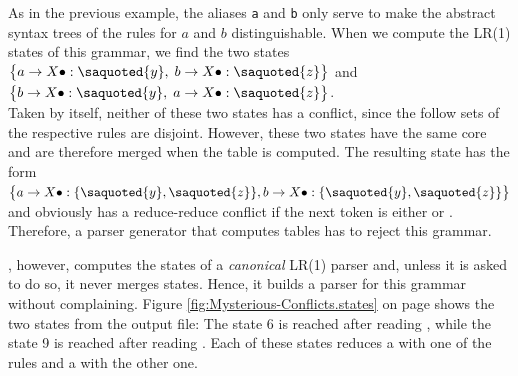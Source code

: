 \noindent
As in the previous example, the aliases \texttt{a} and \texttt{b} only serve to make the abstract syntax trees of
the rules for $a$ and $b$ distinguishable.  When we compute the LR(1) states of this grammar, we find the two states
\\[0.2cm]
\hspace*{1.3cm}
$\bigl\{ a \rightarrow X \bullet: \saquoted{y},\;
         b \rightarrow X \bullet: \saquoted{z}
\bigr\}$
\quad and \quad
$\bigl\{ b \rightarrow X \bullet: \saquoted{y},\;
         a \rightarrow X \bullet: \saquoted{z}
\bigr\}$.
\\[0.2cm]
Taken by itself, neither of these two states has a conflict, since the follow sets of the respective rules are
disjoint.  However, these two states have the same core and are therefore merged when the
 table is computed.  The resulting state has the form
\\[0.2cm]
\hspace*{1.3cm}
$\bigl\{ a \rightarrow X \bullet:\{\saquoted{y}, \saquoted{z} \},
         b \rightarrow X \bullet:\{\saquoted{y}, \saquoted{z} \}
\bigr\}$
\\[0.2cm]
and obviously has a reduce-reduce conflict if the next token is either  or .
Therefore, a parser generator that computes  tables has to reject this grammar.

, however, computes the states of a \emph{canonical} LR(1) parser and, unless it is asked
to do so, it never merges states.
Hence, it builds a parser for this grammar without complaining.  Figure \ref{fig:Mysterious-Conflicts.states}
on page \pageref{fig:Mysterious-Conflicts.states} shows the two states from the output file:  The state 6 is
reached after reading , while the state 9 is reached after reading .  Each of these states
reduces a  with one of the rules and a  with the other one.

